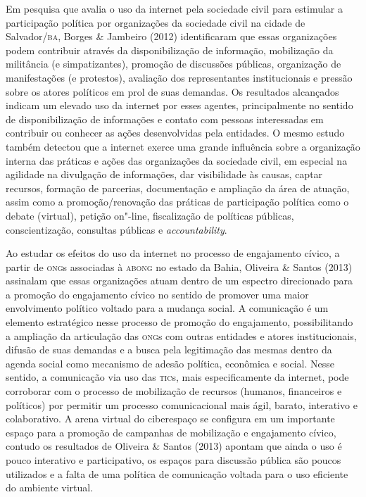 Em pesquisa que avalia o uso da internet pela sociedade civil para
estimular a participação política por organizações da sociedade civil na
cidade de Salvador/\textsc{ba}, Borges \& Jambeiro (2012) identificaram que essas
organizações podem contribuir através da disponibilização de informação,
mobilização da militância (e simpatizantes), promoção de discussões
públicas, organização de manifestações (e protestos), avaliação dos
representantes institucionais e pressão sobre os atores políticos em
prol de suas demandas. Os resultados alcançados indicam um elevado uso
da internet por esses agentes, principalmente no sentido de
disponibilização de informações e contato com pessoas interessadas em
contribuir ou conhecer as ações desenvolvidas pela entidades. O mesmo
estudo também detectou que a internet exerce uma grande influência sobre
a organização interna das práticas e ações das organizações da sociedade
civil, em especial na agilidade na divulgação de informações, dar
visibilidade às causas, captar recursos, formação de parcerias,
documentação e ampliação da área de atuação, assim como a
promoção/renovação das práticas de participação política como o debate
(virtual), petição on"-line, fiscalização de políticas públicas,
conscientização, consultas públicas e \emph{accountability}.

Ao estudar os efeitos do uso da internet no processo de engajamento
cívico, a partir de \textsc{ong}s associadas à \textsc{abong} no estado da Bahia, Oliveira
\& Santos (2013) assinalam que essas organizações atuam dentro de um
espectro direcionado para a promoção do engajamento cívico no sentido de
promover uma maior envolvimento político voltado para a mudança social.
A comunicação é um elemento estratégico nesse processo de promoção do
engajamento, possibilitando a ampliação da articulação das \textsc{ong}s com
outras entidades e atores institucionais, difusão de suas demandas e a
busca pela legitimação das mesmas dentro da agenda social como mecanismo
de adesão política, econômica e social. Nesse sentido, a comunicação via
uso das \textsc{tic}s, mais especificamente da internet, pode corroborar com o
processo de mobilização de recursos (humanos, financeiros e políticos)
por permitir um processo comunicacional mais ágil, barato, interativo e
colaborativo. A arena virtual do ciberespaço se configura em um
importante espaço para a promoção de campanhas de mobilização e
engajamento cívico, contudo os resultados de Oliveira \& Santos (2013)
apontam que ainda o uso é pouco interativo e participativo, os espaços
para discussão pública são poucos utilizados e a falta de uma política
de comunicação voltada para o uso eficiente do ambiente virtual.

